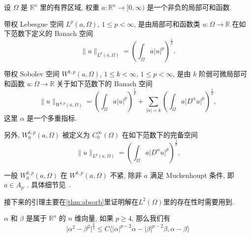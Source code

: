 \documentclass[oneside,longtitle]{LZUthesis}
\numberwithin{equation}{chapter}
\newcommand*\abs[1]{\lvert#1\rvert}
\newcommand*\norm[1]{\lVert#1\rVert}
\newcommand\R{\mathbb{R}}
\begin{document}
设 $\Omega$ 是 $\R^n$ 里的有界区域, 权重
$a \colon \R^n \to [0, \infty)$
是一个非负的局部可和函数.
\begin{definition}
	带权 Lebesgue 空间 $L^p(a, \Omega)$, $1 \leq p < \infty$,
	是由局部可和函数类
	$u \colon \Omega \to \R$ 在如下范数下定义的 Banach 空间
	\begin{equation*}
		\norm{u}_{L^p(a,\Omega)} =
		\left( \int_{\Omega}a\abs{u}^p \right)^{\frac{1}{p}}.
	\end{equation*}
\end{definition}
\begin{definition}
	带权 Sobolev 空间 $W^{k,p}(a,\Omega)$,
	$1 \leq k < \infty$, $1 \leq p < \infty$,
	是由 $k$ 阶弱可微局部可和函数
	$u \colon \Omega \to \R$ 关于如下范数下的 Banach 空间
	\begin{equation*}
		\norm{u}_{W^{k,p}(a,\Omega)} =
		\left( \int_{\Omega}a\abs{u}^p \right)^{\frac{1}{p}}
		+ \sum_{\abs{\alpha}=k}
		\left( \int_{\Omega}a\abs{D^{\alpha}u}^p \right)^{\frac{1}{p}},
	\end{equation*}
	这里 $\alpha$ 是一个多重指标.

	另外,
	$W_0^{k,p}(a,\Omega)$ 被定义为
	$C_0^{\infty}(\Omega)$ 在如下范数下的完备空间
	\begin{equation*}
		\norm{u}_{L^p(a,\Omega)} =
		\left( \int_{\Omega}a\abs{D^{\alpha}u}^p \right)^{\frac{1}{p}}.
	\end{equation*}
\end{definition}
\begin{remark}
	一般 $W_0^{k,p}(a,\Omega)$ 在
	$W^{k,p}(a,\Omega)$ 不紧, 除非 $a$ 满足 Muckenhoupt 条件, 即 $a \in A_{p^-}$. 具体细节见~\cite{goldshteinWeightedSobolevSpaces2009}.
\end{remark}
接下来的引理主要在\cref{thm:absorb}里证明解在$L^2(\Omega)$里的存在性时需要用到.
\begin{lemma}\label{lem:VecIneq}
	$\alpha$ 和 $\beta$ 是属于 $\R^{n}$ 的 $n$ 维向量, 如果 $p \geq 4$, 那么我们有
	\begin{equation*}
		\abs{\alpha^2 - \beta^2}^{\frac{p}{2}}
		\leq C \langle \abs{\alpha}^{p-2}\alpha - \abs{\beta}^{p-2}\beta, \alpha-\beta\rangle
	\end{equation*}
\end{lemma}
\end{document}
